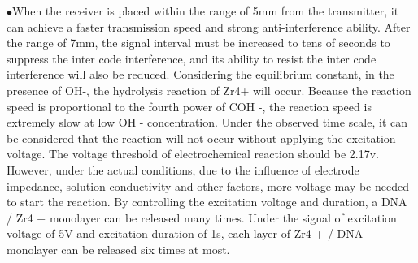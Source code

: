 \begin{digest}
  $\bullet$When the receiver is placed within the range of 5mm from the transmitter, it can achieve a faster transmission speed and strong anti-interference ability. After the range of 7mm, the signal interval must be increased to tens of seconds to suppress the inter code interference, and its ability to resist the inter code interference will also be reduced. 
  Considering the equilibrium constant, in the presence of OH-, the hydrolysis reaction of Zr4+ will occur. Because the reaction speed is proportional to the fourth power of COH -, the reaction speed is extremely slow at low OH - concentration. Under the observed time scale, it can be considered that the reaction will not occur without applying the excitation voltage. The voltage threshold of electrochemical reaction should be 2.17v. However, under the actual conditions, due to the influence of electrode impedance, solution conductivity and other factors, more voltage may be needed to start the reaction. By controlling the excitation voltage and duration, a DNA / Zr4 + monolayer can be released many times. Under the signal of excitation voltage of 5V and excitation duration of 1s, each layer of Zr4 + / DNA monolayer can be released six times at most.


\end{digest}
